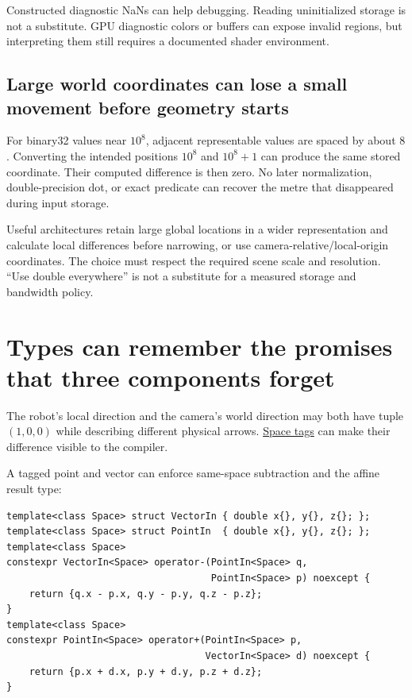 Constructed diagnostic NaNs can help debugging. Reading uninitialized storage is not a substitute. GPU diagnostic colors or buffers can expose invalid regions, but interpreting them still requires a documented shader environment.

\subsection{Large world coordinates can lose a small movement before geometry starts}\label{02-foundations-ii-ch037-large-world-coordinates-can-lose-a-small-movement-before-geometry-starts}

For binary32 values near \(10^8\), adjacent representable values are spaced by about \(8\). Converting the intended positions \(10^8\) and \(10^8+1\) can produce the same stored coordinate. Their computed difference is then zero. No later normalization, double-precision dot, or exact predicate can recover the metre that disappeared during input storage.

Useful architectures retain large global locations in a wider representation and calculate local differences before narrowing, or use camera-relative/local-origin coordinates. The choice must respect the required scene scale and resolution. ``Use double everywhere'' is not a substitute for a measured storage and bandwidth policy.

\section{Types can remember the promises that three components forget}\label{02-foundations-ii-ch037-types-can-remember-the-promises-that-three-components-forget}

The robot's local direction and the camera's world direction may both have tuple \((1,0,0)\) while describing different physical arrows. \hyperref[02-foundations-ii-ch037-types-can-remember-the-promises-that-three-components-forget]{Space tags} can make their difference visible to the compiler.

A tagged point and vector can enforce same-space subtraction and the affine result type:

\begin{verbatim}
template<class Space> struct VectorIn { double x{}, y{}, z{}; };
template<class Space> struct PointIn  { double x{}, y{}, z{}; };
template<class Space>
constexpr VectorIn<Space> operator-(PointIn<Space> q,
                                    PointIn<Space> p) noexcept {
    return {q.x - p.x, q.y - p.y, q.z - p.z};
}
template<class Space>
constexpr PointIn<Space> operator+(PointIn<Space> p,
                                   VectorIn<Space> d) noexcept {
    return {p.x + d.x, p.y + d.y, p.z + d.z};
}
\end{verbatim}

